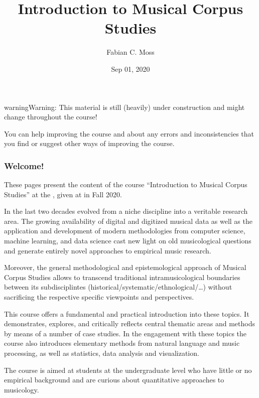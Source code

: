 \documentclass[letterpaper,10pt,english]{sphinxmanual}
\title{Introduction to Musical Corpus Studies}
\date{Sep 01, 2020}
\author{Fabian C.\@{} Moss}
\begin{document}
\pagestyle{empty}
\sphinxmaketitle
\pagestyle{plain}
\sphinxtableofcontents
\pagestyle{normal}
\label{\detokenize{index::doc}}


\begin{sphinxadmonition}{warning}{Warning:}
This material is still (heavily) under construction and might change throughout the course!

You can help improving the course and  about any errors and inconsistencies that you find
or suggest other ways of improving the course.
\end{sphinxadmonition}
\subsubsection*{Welcome!}

These pages present the content of the course “Introduction to Musical Corpus Studies” at the ,
given at  in Fall 2020.

In the last two decades  evolved from a niche discipline into a veritable research area.
The growing availability of digital and digitized musical data as well as the application and development of modern
methodologies from computer science, machine learning, and data science cast new light on old musicological questions
and generate entirely novel approaches to empirical music research.

Moreover, the general methodological and epistemological approach of Musical Corpus Studies allows to transcend traditional
intra\sphinxhyphen{}musicological boundaries between its sub\sphinxhyphen{}disciplintes (historical/systematic/ethnological/…) without sacrificing the
respective specific viewpoints and perspectives.

This course offers a fundamental and practical introduction into these topics.
It demonstrates, explores, and critically reflects central thematic areas and methods by means of a number of case studies.
In the engagement with these topics the course also introduces elementary methods from natural language and music processing,
as well as statistics, data analysis and visualization.

The course is aimed at students at the undergraduate level who have little or no empirical background and are curious
about quantitative approaches to musicology.
\end{document}
